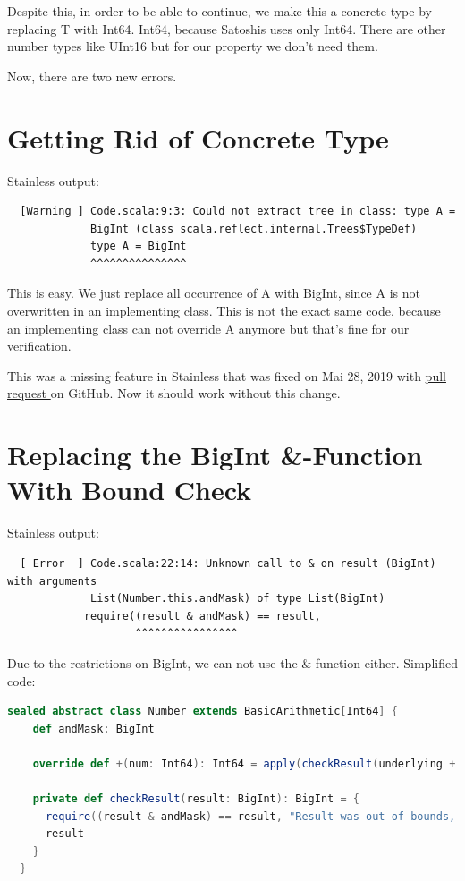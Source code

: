 Despite this, in order to be able to continue, we make this a concrete type by replacing T with Int64.
Int64,  because Satoshis uses only Int64.
There are other number types like UInt16 but for our property we don't need them.

Now, there are two new errors.


\section{Getting Rid of Concrete Type}

Stainless output:
{\footnotesize\begin{verbatim}
  [Warning ] Code.scala:9:3: Could not extract tree in class: type A =
             BigInt (class scala.reflect.internal.Trees$TypeDef)
             type A = BigInt
             ^^^^^^^^^^^^^^^
\end{verbatim}}

This is easy.
We just replace all occurrence of A with BigInt, since A is not overwritten in an implementing class.
This is not the exact same code, because an implementing class can not override A anymore but that's fine for our verification.

This was a missing feature in Stainless that was fixed on Mai 28, 2019 with \href{https://github.com/epfl-lara/stainless/pull/470}{pull request } on GitHub.
Now it should work without this change.


\section{Replacing the BigInt \&-Function With Bound Check}
\label{sec:bound_check}

Stainless output:
{\footnotesize\begin{verbatim}
  [ Error  ] Code.scala:22:14: Unknown call to & on result (BigInt) with arguments
             List(Number.this.andMask) of type List(BigInt)
            require((result & andMask) == result,
                    ^^^^^^^^^^^^^^^^
\end{verbatim}}

Due to the restrictions on BigInt, we can not use the \& function either.
Simplified code:
\begin{lstlisting}[language=scala]
  sealed abstract class Number extends BasicArithmetic[Int64] {
    def andMask: BigInt

    override def +(num: Int64): Int64 = apply(checkResult(underlying + num.underlying))

    private def checkResult(result: BigInt): BigInt = {
      require((result & andMask) == result, "Result was out of bounds, got: " + result)
      result
    }
  }
\end{lstlisting}

